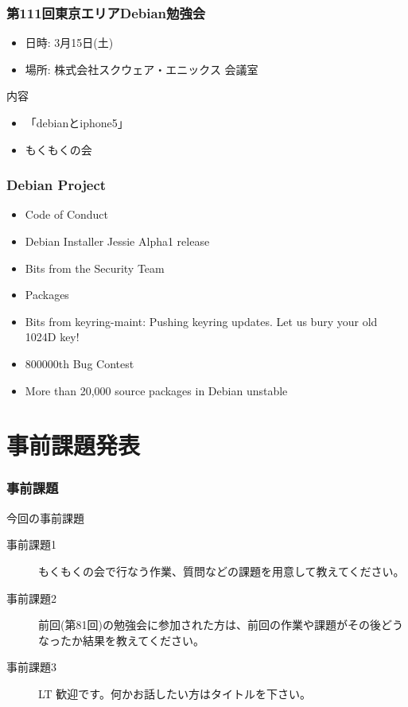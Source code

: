 \documentclass[cjk,dvipdfmx,10pt,compress,%
hyperref={bookmarks=true,bookmarksnumbered=true,bookmarksopen=false,%
colorlinks=false,%
pdftitle={第 82 回 関西 Debian 勉強会},%
pdfauthor={倉敷・のがた・佐々木・かわだ・八津尾},%
pdfsubject={資料},%
}]{beamer}
\begin{document}
\begin{frame}[fragile]
  \frametitle{第111回東京エリアDebian勉強会}
  \begin{itemize}
  \item 日時: 3月15日(土)
  \item 場所: 株式会社スクウェア・エニックス 会議室
  \end{itemize}
  \begin{block}{内容}
    \begin{itemize}
    \item 「debianとiphone5」
    \item もくもくの会
    \end{itemize}
  \end{block}
\end{frame}

\begin{frame}[fragile]
  \frametitle{Debian Project}
  \begin{itemize}
  \item Code of Conduct
  \item Debian Installer Jessie Alpha1 release
  \item Bits from the Security Team
  \item Packages
  \item Bits from keyring-maint: Pushing keyring updates. Let us bury your old 1024D key!
  \item 800000th Bug Contest
  \item More than 20,000 source packages in Debian unstable
  \end{itemize}
\end{frame}


\section{事前課題発表}


\begin{frame}[fragile]
  \frametitle{事前課題}
  \begin{block}{今回の事前課題}
    \begin{description}
    \item[事前課題1]
      もくもくの会で行なう作業、質問などの課題を用意して教えてください。
    \item[事前課題2]
      前回(第81回)の勉強会に参加された方は、前回の作業や課題がその後どう
      なったか結果を教えてください。
    \item[事前課題3]
      LT 歓迎です。何かお話したい方はタイトルを下さい。
    \end{description}
  \end{block}
\end{frame}
\end{document}
